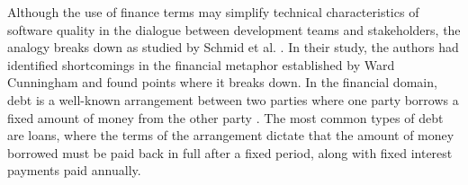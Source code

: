 \documentclass{mprop}
\begin{document}
Although the use of finance terms may simplify technical characteristics of
software quality in the dialogue between development teams and stakeholders, the
analogy breaks down as studied by Schmid et al. \cite{Schmid2013}. In their
study, the authors had identified shortcomings in the financial metaphor
established by Ward Cunningham \cite{Cunningham1993} and found points where it
breaks down. In the financial domain, debt is a well-known arrangement between
two parties where one party borrows a fixed amount of money from the other party
\cite{debt-investopedia}. The most common types of debt are loans, where the
terms of the arrangement dictate that the amount of money borrowed must be paid
back in full after a fixed period, along with fixed interest payments paid
annually.
\end{document}
